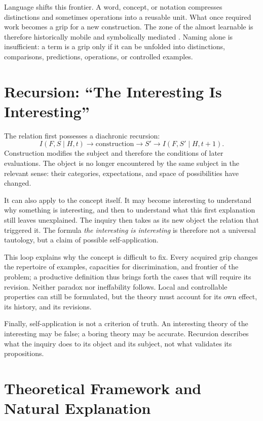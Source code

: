 \documentclass[11pt,a4paper]{article}
\begin{document}
Language shifts this frontier. A word, concept, or notation compresses
distinctions and sometimes operations into a reusable unit. What once required
work becomes a grip for a new construction. The zone of the almost learnable is
therefore historically mobile and symbolically mediated
\parencite{vygotsky1978mind,lenat1991thresholds,lenat2008turtle,koestler1989act,steels2005coordinating,steels2015talkingheads}.
Naming alone is insufficient: a term is a grip only if it can be unfolded into
distinctions, comparisons, predictions, operations, or controlled examples.

\section{Recursion: ``The Interesting Is Interesting''}

The relation first possesses a diachronic recursion:
\[
  I(F,S\mid H,t)\longrightarrow
  \text{construction}\longrightarrow S'
  \longrightarrow I(F,S'\mid H,t+1).
\]
Construction modifies the subject and therefore the conditions of later
evaluations. The object is no longer encountered by the same subject in the
relevant sense: their categories, expectations, and space of possibilities
have changed.

It can also apply to the concept itself. It may become interesting to
understand why something is interesting, and then to understand what this first
explanation still leaves unexplained. The inquiry then takes as its new object
the relation that triggered it. The formula \emph{the interesting is
interesting} is therefore not a universal tautology, but a claim of possible
self-application.

This loop explains why the concept is difficult to fix. Every acquired grip
changes the repertoire of examples, capacities for discrimination, and frontier
of the problem; a productive definition thus brings forth the cases that will
require its revision. Neither paradox nor ineffability follows. Local and
controllable properties can still be formulated, but the theory must account
for its own effect, its history, and its revisions.

Finally, self-application is not a criterion of truth. An interesting theory of
the interesting may be false; a boring theory may be accurate. Recursion
describes what the inquiry does to its object and its subject, not what validates
its propositions.

\section{Theoretical Framework and Natural Explanation}
\end{document}
